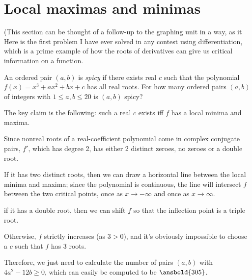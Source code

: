 \documentclass[mast]{lucky}
\begin{document}
\section{Local maximas and minimas}
(This section can be thought of a follow-up to the graphing unit in a way, as it 
Here is the first problem I have ever solved in any contest using differentiation, which is a prime example of how the roots of derivatives can give us critical information on a function.
\begin{exam}
An ordered pair $(a,b)$ is \textit{spicy} if there exists real $c$ such that the polynomial $f(x)=x^3+ax^2+bx+c$ has all real roots. For how many ordered pairs $(a,b)$ of integers with $1\le a,b\le 20$ is $(a,b)$ spicy?
\end{exam}
\begin{sol}
The key claim is the following: such a real $c$ exists iff $f$ has a local minima and maxima.

Since nonreal roots of a real-coefficient polynomial come in complex conjugate pairs, $f'$, which has degree 2, has either 2 distinct zeroes, no zeroes or a double root.

If it has two distinct roots, then we can draw a horizontal line between the local minima and maxima; since the polynomial is continuous, the line will intersect $f$ between the two critical points, once as $x\rightarrow -\infty$ and once as $x\rightarrow \infty$.

if it has a double root, then we can shift $f$ so that the inflection point is a triple root.

Otherwise, $f$ strictly increases (as $3>0$), and it's obviously impossible to choose a $c$ such that $f$ has 3 roots.

Therefore, we just need to calculate the number of pairs $(a,b)$ with $4a^2-12b\ge 0$, which can easily be computed to be $\ansbold{305}$.
\end{sol}
\end{document}
